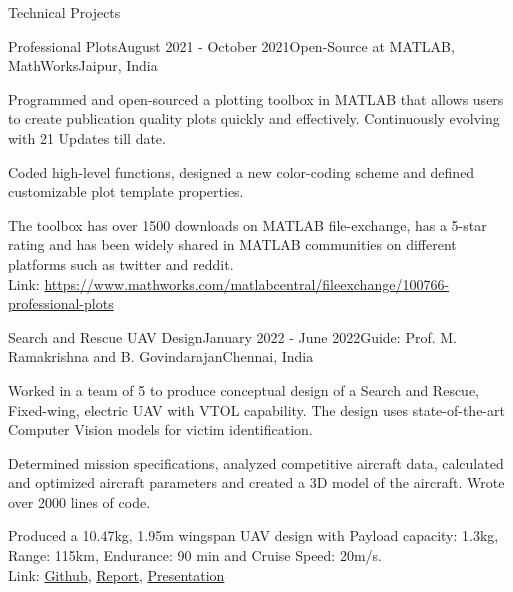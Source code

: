 \documentclass{resume} %
\begin{document}



\begin{rSection}{Technical Projects}

\begin{rSubsection}{Professional Plots}{August 2021 - October 2021}{Open-Source at MATLAB, MathWorks}{Jaipur, India}
\item Programmed and open-sourced a plotting toolbox in MATLAB that allows users to create publication quality plots quickly and effectively. Continuously evolving with 21 Updates till date.
\item Coded high-level functions, designed a new color-coding scheme and defined customizable plot template properties.
\item The toolbox has over 1500 downloads on MATLAB file-exchange, has a 5-star rating and has been widely shared in MATLAB communities on different platforms such as twitter and reddit.\\
Link: \url{https://www.mathworks.com/matlabcentral/fileexchange/100766-professional-plots}
\end{rSubsection}

\begin{rSubsection}{Search and Rescue UAV Design}{January 2022 - June 2022}{Guide: Prof. M. Ramakrishna and B. Govindarajan}{Chennai, India}
\item Worked in a team of 5 to produce conceptual design of a Search and Rescue, Fixed-wing, electric UAV with VTOL capability. The design uses state-of-the-art Computer Vision models for victim identification.
\item Determined mission specifications, analyzed competitive aircraft data, calculated and optimized aircraft parameters and created a 3D model of the aircraft. Wrote over 2000 lines of code.
\item Produced a 10.47kg, 1.95m wingspan UAV design with Payload capacity: 1.3kg, Range: 115km, Endurance: 90 min and Cruise Speed: 20m/s. \\
Link: \href{https://github.com/atharvaaalok/Team_SARAS/blob/main/README.md}{Github}, \href{https://drive.google.com/file/d/1HocN6BsbAa9H1-C-mmuJQs2mCIaiqp2t/view?usp=share_link}{Report}, \href{https://docs.google.com/presentation/d/1NcbMm-wtPhm4w6FDH98jIfHGdG3I0Hs5Ku-Nd__8FkQ/edit?usp=share_link}{Presentation}
\end{rSubsection}


\end{rSection}
\end{document}
